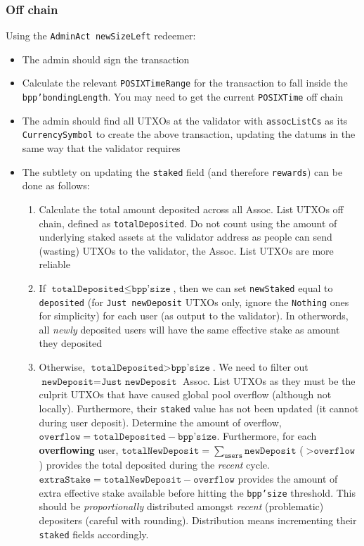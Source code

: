 \documentclass[10pt, a4paper]{article}
\theoremstyle{definition}
\begin{document}
\subsubsection{Off chain}
Using the \texttt{AdminAct newSizeLeft} redeemer:
\begin{itemize}
\item{The admin should sign the transaction}
\item{Calculate the relevant \texttt{POSIXTimeRange} for the transaction to fall inside the \texttt{bpp'bondingLength}. You may need to get the current \texttt{POSIXTime} off chain}
\item{The admin should find all UTXOs at the validator with \texttt{assocListCs} as its \texttt{CurrencySymbol} to create the above transaction, updating the datums in the same way that the validator requires}
\item{The subtlety on updating the \texttt{staked} field (and therefore \texttt{rewards}) can be done as follows:
\begin{enumerate}
\item{Calculate the total amount deposited across all Assoc. List UTXOs off chain, defined as \texttt{totalDeposited}. Do not count using the amount of underlying staked assets at the validator address as people can send (wasting) UTXOs to the validator, the Assoc. List UTXOs are more reliable}
\item{If $\texttt{totalDeposited} \leq \texttt{bpp'size}$, then we can set \texttt{newStaked} equal to \texttt{deposited} (for \texttt{Just newDeposit} UTXOs only, ignore the \texttt{Nothing} ones for simplicity) for each user (as output to the validator). In otherwords, all \textit{newly} deposited users will have the same effective stake as amount they deposited}
\item{Otherwise, $\texttt{totalDeposited} > \texttt{bpp'size}$. We need to filter out $\texttt{newDeposit}=\texttt{Just newDeposit}$ Assoc. List UTXOs as they must be the culprit UTXOs that have caused global pool overflow (although not locally). Furthermore, their \texttt{staked} value has not been updated (it cannot during user deposit). Determine the amount of overflow, $\texttt{overflow}=\texttt{totalDeposited} - \texttt{bpp'size}$. Furthermore, for each \textbf{overflowing} user, $\texttt{totalNewDeposit} = \sum_\texttt{users}\texttt{newDeposit}$ ($> \texttt{overflow}$) provides the total deposited during the \textit{recent} cycle. $\texttt{extraStake} = \texttt{totalNewDeposit} - \texttt{overflow}$ provides the amount of extra effective stake available before hitting the \texttt{bpp'size} threshold. This should be \textit{proportionally} distributed amongst \textit{recent} (problematic) depositers (careful with rounding). Distribution means incrementing their \texttt{staked} fields accordingly.
}
\end{enumerate}}
\end{itemize}
\end{document}
